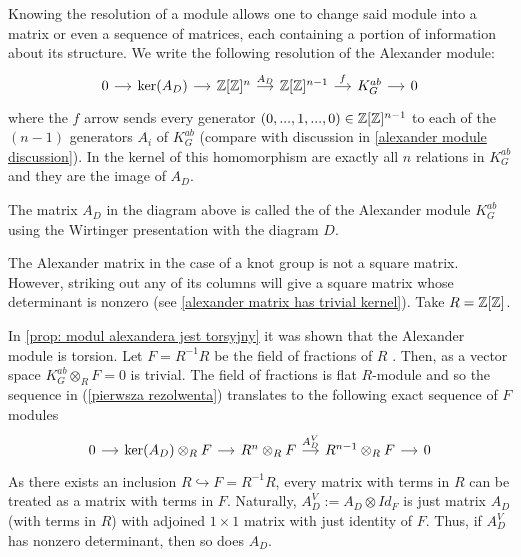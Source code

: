 Knowing the resolution of a module allows one to change said module into a matrix or even a sequence of matrices, each containing a portion of information about its structure.
We write the following resolution of the Alexander module:
\begin{equation}\label{pierwsza rezolwenta}
  \begin{tikzcd}[column sep=small]
    0\arrow[r] & \ker(A_D)\arrow[r] & \Z[\Z]^{n}\arrow[r, "A_D"] & \Z[\Z]^{n-1}\arrow[r, "f"] & K_G^{ab}\arrow[r] & 0
  \end{tikzcd}
\end{equation}
where the $f$ arrow sends every generator $(0,..., 1,...,0)\in\operatorname{\mathbb{Z}}[\operatorname{\mathbb{Z}}]^{n-1}$ to each of the $(n-1)$ generators $A_i$ of $K_G^{ab}$ (compare with discussion in \cref{alexander module discussion}). In the kernel of this homomorphism are exactly all $n$ relations in $K_G^{ab}$ and they are the image of $A_D$.

\begin{definition}\label{alexander matrix def}
  The matrix $A_D$ in the diagram above is called the  of the Alexander module $K_G^{ab}$ using the Wirtinger presentation with the diagram $D$.
\end{definition}

The Alexander matrix in the case of a knot group is not a square matrix. However, striking out any of its columns will give a square matrix whose determinant is nonzero (see \cref{alexander matrix has trivial kernel}).  Take $R=\operatorname{\mathbb{Z}}[\operatorname{\mathbb{Z}}]$. 

In \cref{prop: modul alexandera jest torsyjny} it was shown that the Alexander module is torsion. Let $F=R^{-1}R$ be the field of fractions of $R$ \cite[Chapter~2]{atiyah}. Then, as a vector space $K_G^{ab}\otimes_R F=0$ is trivial. The field of fractions is flat $R$-module \cite[Corollary~3.6]{atiyah} and so the sequence in (\ref{pierwsza rezolwenta}) translates to the following exact sequence of $F$ modules
\begin{equation}\label{resolution vector spaces}
  \begin{tikzcd}[column sep=small]
    0\arrow[r] & \ker(A_D)\otimes_RF \arrow[r] & R^n\otimes_R F \arrow[r, "A_D^V"] & R^{n-1}\otimes_R F \arrow[r] & 0
  \end{tikzcd}
\end{equation}
As there exists an inclusion $R\hookrightarrow F=R^{-1}R$, every matrix with terms in $R$ can be treated as a matrix with terms in $F$. Naturally, $A_D^V:=A_D\otimes Id_{F}$ is just matrix $A_D$ (with terms in $R$) with adjoined $1\times 1$ matrix with just identity of $F$. Thus, if $A_D^V$ has nonzero determinant, then so does $A_D$.

